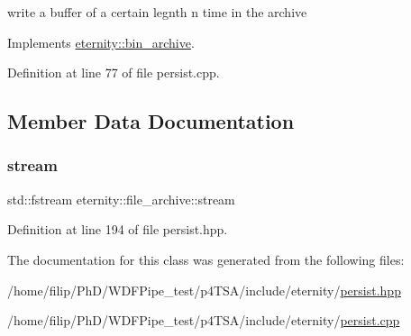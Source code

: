 write a buffer of a certain legnth n time in the archive 



Implements \hyperlink{classeternity_1_1bin__archive_acbe041b0815f2721ee18ad042557b14e}{eternity\+::bin\+\_\+archive}.



Definition at line 77 of file persist.\+cpp.



\subsection{Member Data Documentation}
\mbox{\label{classeternity_1_1file__archive_ac702d57d9633f8695476da8a7d55dd9d}} 
\subsubsection{\texorpdfstring{stream}{stream}}
{\footnotesize\ttfamily std\+::fstream eternity\+::file\+\_\+archive\+::stream\hspace{0.3cm}{\ttfamily [private]}}



Definition at line 194 of file persist.\+hpp.



The documentation for this class was generated from the following files\+:\begin{DoxyCompactItemize}
\item 
/home/filip/\+Ph\+D/\+W\+D\+F\+Pipe\+\_\+test/p4\+T\+S\+A/include/eternity/\hyperlink{persist_8hpp}{persist.\+hpp}\item 
/home/filip/\+Ph\+D/\+W\+D\+F\+Pipe\+\_\+test/p4\+T\+S\+A/include/eternity/\hyperlink{persist_8cpp}{persist.\+cpp}\end{DoxyCompactItemize}
